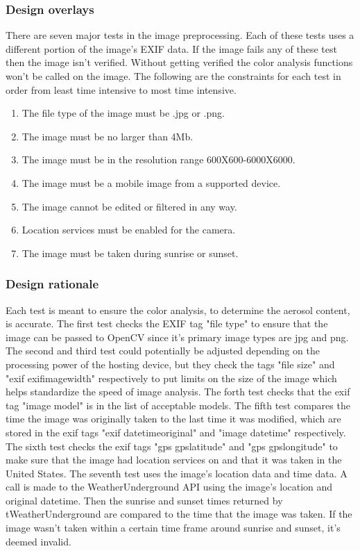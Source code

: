 \documentclass[onecolumn, draftclsnofoot,10pt, compsoc]{IEEEtran}
\begin{document}
\begin{singlespace}
      \subsubsection{Design overlays}
		There are seven major tests in the image preprocessing.
		Each of these tests uses a different portion of the image's EXIF data.
		If the image fails any of these test then the image isn't verified.
		Without getting verified the color analysis functions won't be called on the image.
		The following are the constraints for each test in order from least time intensive to most time intensive.
		\begin{enumerate}
			\item The file type of the image must be .jpg or .png.
			\item The image must be no larger than 4Mb.
			\item The image must be in the resolution range 600X600-6000X6000.
			\item The image must be a mobile image from a supported device.
			\item The image cannot be edited or filtered in any way.
			\item Location services must be enabled for the camera.
			\item The image must be taken during sunrise or sunset.
		\end{enumerate}
      \subsubsection{Design rationale}
		Each test is meant to ensure the color analysis, to determine the aerosol content, is accurate.
		The first test checks the EXIF tag "file type" to ensure that the image can be passed to OpenCV since it's primary image types are jpg and png.
		The second and third test could potentially be adjusted depending on the processing power of the hosting device, but they check the tags "file size" and "exif exifimagewidth" respectively to put limits on the size of the image which helps standardize the speed of image analysis.
		The forth test checks that the exif tag "image model" is in the list of acceptable models.
		The fifth test compares the time the image was originally taken to the last time it was modified, which are stored in the exif tags "exif datetimeoriginal" and "image datetime" respectively.
		The sixth test checks the exif tags "gps gpslatitude" and "gps gpslongitude" to make sure that the image had location services on and that it was taken in the United States.
		The seventh test uses the image's location data and time data.
		A call is made to the WeatherUnderground API using the image's location and original datetime.
		Then the sunrise and sunset times returned by tWeatherUnderground are compared to the time that the image was taken.
		If the image wasn't taken within a certain time frame around sunrise and sunset, it's deemed invalid.

\end{singlespace}
\end{document}
